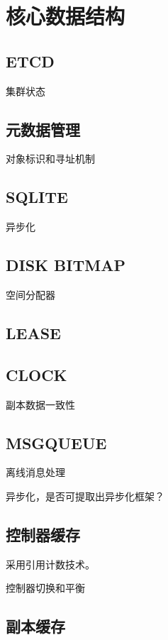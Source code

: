 \chapter{核心数据结构}

\section{ETCD}

集群状态

\section{元数据管理}

对象标识和寻址机制

\section{SQLITE}

异步化

\section{DISK BITMAP}

空间分配器

\section{LEASE}

\section{CLOCK}

副本数据一致性

\section{MSGQUEUE}

离线消息处理

异步化，是否可提取出异步化框架？

\section{控制器缓存}

采用引用计数技术。

控制器切换和平衡

\section{副本缓存}

